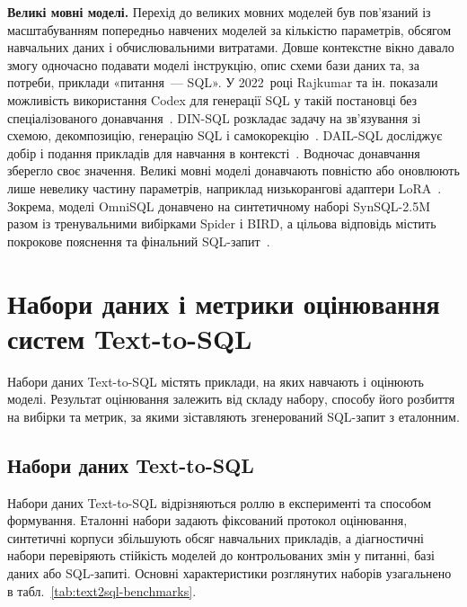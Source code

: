 \documentclass[a4paper,14pt,oneside]{extreport}
\begin{document}
\textbf{Великі мовні моделі.}
Перехід до великих мовних моделей був пов’язаний із масштабуванням попередньо навчених моделей за кількістю параметрів, обсягом навчальних даних і обчислювальними витратами. Довше контекстне вікно давало змогу одночасно подавати моделі інструкцію, опис схеми бази даних та, за потреби, приклади «питання~--- SQL». У 2022~році Rajkumar та ін. показали можливість використання Codex для генерації SQL у такій постановці без спеціалізованого донавчання~\cite{rajkumar2022evaluating}. DIN-SQL розкладає задачу на зв’язування зі схемою, декомпозицію, генерацію SQL і самокорекцію~\cite{pourreza2023dinsql}. DAIL-SQL досліджує добір і подання прикладів для навчання в контексті~\cite{gao2024benchmark}. Водночас донавчання зберегло своє значення. Великі мовні моделі донавчають повністю або оновлюють лише невелику частину параметрів, наприклад низькорангові адаптери LoRA~\cite{liu2025survey,hu2022lora}. Зокрема, моделі OmniSQL донавчено на синтетичному наборі SynSQL-2.5M разом із тренувальними вибірками Spider і BIRD, а цільова відповідь містить покрокове пояснення та фінальний SQL-запит~\cite{li2025omnisql}.

\section{Набори даних і метрики оцінювання систем Text-to-SQL}
\label{sec:text2sql-datasets-evaluation}

Набори даних Text-to-SQL містять приклади, на яких навчають і оцінюють моделі. Результат оцінювання залежить від складу набору, способу його розбиття на вибірки та метрик, за якими зіставляють згенерований SQL-запит з еталонним.

\subsection{Набори даних Text-to-SQL}
\label{subsec:text2sql-benchmarks}

Набори даних Text-to-SQL відрізняються роллю в експерименті та способом формування. Еталонні набори задають фіксований протокол оцінювання, синтетичні корпуси збільшують обсяг навчальних прикладів, а діагностичні набори перевіряють стійкість моделей до контрольованих змін у питанні, базі даних або SQL-запиті. Основні характеристики розглянутих наборів узагальнено в табл.~\ref{tab:text2sql-benchmarks}.
\end{document}
